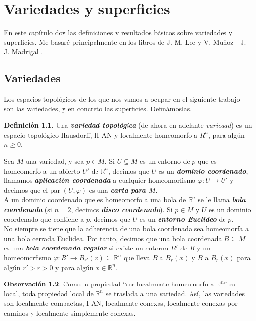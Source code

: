 \documentclass[10pt]{report}
\newcommand{\R}{\mathbb{R}}
\newcommand{\enfatiza}[1]{\textbf{\textit{#1}}}
\theoremstyle{definition}
\newtheorem{defin}{Definición}[section]
\newtheorem{obs}[defin]{Observación}
\begin{document}
\chapter{Variedades y superficies}
\setcounter{page}{1}
En este capítulo doy las definiciones y resultados básicos sobre variedades y superficies. Me basaré principalmente en los libros de J. M. Lee \cite{lee1} y V. Muñoz - J. J. Madrigal \cite{juanjo}.\\

\section{Variedades}\label{sec:variedades}
Los espacios topológicos de los que nos vamos a ocupar en el siguiente trabajo son las variedades, y en concreto las superficies. Definámoslas.
\begin{defin}\label{def:variedad}%
Una \textbf{\emph{variedad topológica}} (de ahora en adelante \emph{variedad}) es un espacio topológico Hausdorff, II AN y localmente homeomorfo a $R^n$, para algún $n\geq 0$.
\end{defin}
Sea $M$ una variedad, y sea $p\in M$. Si $U\subseteq M$ es un entorno de $p$ que es homeomorfo a un abierto $U'$ de $\R^n$, decimos que $U$ es un \enfatiza{dominio coordenado}, llamamos \enfatiza{aplicación coordenada} a cualquier homeomorfismo $\varphi :U\to U'$ y decimos que el par $(U,\varphi )$ es una \enfatiza{carta para $M$}.\\
A un dominio coordenado que es homeomorfo a una bola de $\R^n$ se le llama \enfatiza{bola coordenada} (si $n=2$, decimos \enfatiza{disco coordenado}). Si $p\in M$ y $U$ es un dominio coordenado que contiene a $p$, decimos que $U$ es un \enfatiza{entorno Euclídeo} de $p$.\\
No siempre se tiene que la adherencia de una bola coordenada sea homeomorfa a una bola cerrada Euclidea. Por tanto, decimos que una bola coordenada $B\subseteq M$ es una \enfatiza{bola coordenada regular} si existe un entorno $B'$ de $\overline{B}$ y un homeomorfismo $\varphi:B'\to B_{r'}(x)\subseteq \R^n$ que lleva $B$ a $B_r(x)$ y $\overline{B}$ a $\overline{B}_r(x)$ para algún $r'>r>0$ y para algún $x\in \R^n$.
\begin{obs}%
Como la propiedad ``ser localmente homeomorfo a $\R^n$'' es local, toda propiedad local de $\R^n$ se traslada a una variedad. Así, las variedades son localmente compactas, I AN, localmente conexas, localmente conexas por caminos y localmente simplemente conexas.
\end{obs}%
\end{document}
